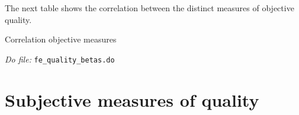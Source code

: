 \documentclass[oneside,11pt]{article}
\begin{document}
The next table shows the correlation between the distinct measures of objective quality.


\begin{table}[H]
    \caption{Correlation objective measures}
    \label{betas_cor}
     \begin{center}
    \scriptsize{}
    \end{center}
  \scriptsize{ \noindent 
    \textit{Do file: }  \texttt{fe\_quality\_betas.do}}
\end{table}




\section{Subjective measures of quality}

 





% 






\end{document}
